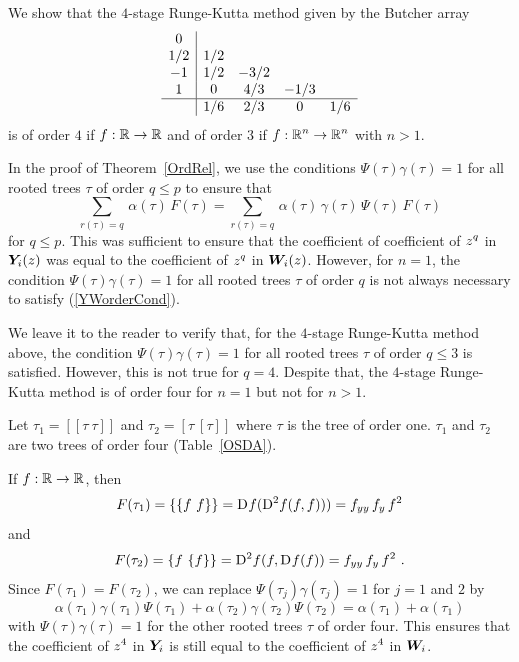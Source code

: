 \begin{rmk}
We show that the $4$-stage Runge-Kutta method given by the
Butcher array 
\[
\begin{array}{c|ccccc}
0 & \\
1/2 & 1/2 \\
-1 & 1/2 & -3/2 \\
1 & 0 & 4/3 & -1/3 \\
\hline
 & 1/6 & 2/3 & 0 & 1/6
\end{array}
\]
is of order $4$ if $f:\RR \rightarrow \RR$ and of order $3$ if
$\DS f:\RR^n\rightarrow\RR^n$ with $n>1$.

In the proof of Theorem~\ref{OrdRel}, we use the conditions
$\Psi(\tau)\gamma(\tau) = 1$ for all rooted trees $\tau$ of order
$q \leq p$ to ensure that
\begin{equation} \label{YWorderCond}
\sum_{r(\tau)=q}\,\alpha(\tau)\,F(\tau)
= \sum_{r(\tau)=q}\,\alpha(\tau)\,\gamma(\tau)\,\Psi(\tau)\,F(\tau)
\end{equation}
for $q \leq p$.  This was sufficient to ensure that the coefficient of 
coefficient of $\DS z^q$ in $\VEC{Y}_i(z)$ was equal to the
coefficient of $\DS z^q$ in $\VEC{W}_i(z)$.  However, for
$n=1$, the condition $\Psi(\tau)\gamma(\tau) = 1$ for all rooted trees
$\tau$ of order $q$ is not always necessary to satisfy (\ref{YWorderCond}).

We leave it to the reader to verify that, for the $4$-stage
Runge-Kutta method above, the condition
$\Psi(\tau)\gamma(\tau) = 1$ for all rooted trees $\tau$ of order
$q \leq 3$ is satisfied.  However, this is not true for $q=4$.
Despite that, the $4$-stage Runge-Kutta method is of order four for
$n=1$ but not for $n>1$.

Let $\tau_1 = [[\tau\ \tau]]$ and $\tau_2 = [\tau\ [\tau]]$ where
$\tau$ is the tree of order one.  $\tau_1$ and $\tau_2$ are two
trees of order four (Table~\ref{OSDA}).

If $f:\RR\rightarrow\RR$, then
\[
F(\tau_1) = \{\{f\ f\}\} = \fdiff{f}{}(\fdiff{f}{2}(f,f))) =
f_{yy}\,f_y\,f^2
\]
and
\[
F(\tau_2) = \{f\ \{f\}\} = \fdiff{f}{2}(f,\fdiff{f}{}(f)) =
f_{yy}\,f_y\,f^2 \ .
\]
Since $F(\tau_1) = F(\tau_2)$, we can replace 
$\Psi(\tau_j)\gamma(\tau_j) = 1$ for $j=1$ and $2$ by
\[
\alpha(\tau_1)\gamma(\tau_1)\Psi(\tau_1) +
\alpha(\tau_2)\gamma(\tau_2)\Psi(\tau_2) = \alpha(\tau_1) +
\alpha(\tau_1)
\]
with $\Psi(\tau)\gamma(\tau) = 1$ for the other rooted trees $\tau$ of
order four.  This ensures that the coefficient of $\DS z^4$ in
$\VEC{Y}_i$ is still equal to the coefficient of
$\DS z^4$ in $\VEC{W}_i$.


\end{rmk}
